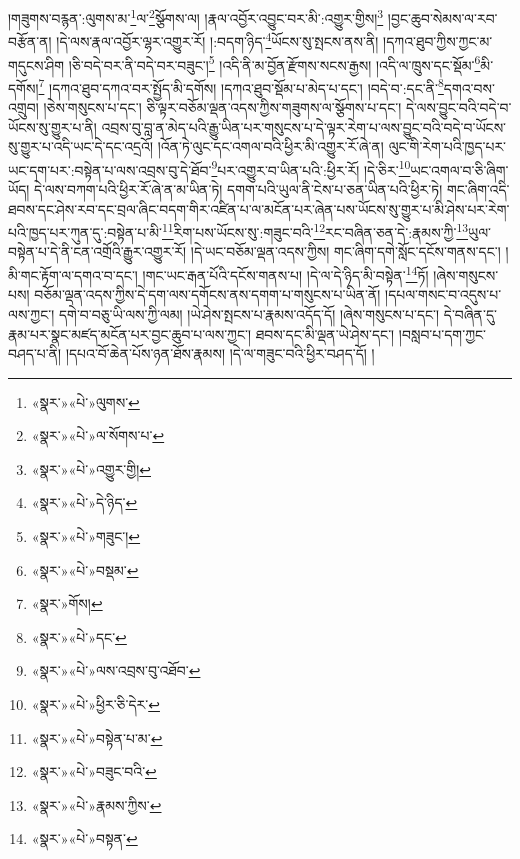 །གཟུགས་བརྙན་:ལུགས་མ་\footnote{«སྣར་»«པེ་»ལུགས་}ལ་\footnote{«སྣར་»«པེ་»ལ་སོགས་པ་}སྩོགས་ལ། །རྣལ་འབྱོར་འབྱུང་བར་མི་:འགྱུར་གྱིས།\footnote{«སྣར་»«པེ་»འགྱུར་གྱི།} །བྱང་ཆུབ་སེམས་ལ་རབ་བརྩོན་ན། །དེ་ལས་རྣལ་འབྱོར་ལྷར་འགྱུར་རོ། །:བདག་ཉིད་\footnote{«སྣར་»«པེ་»དེ་ཉིད་}ཡོངས་སུ་སྤངས་ནས་ནི། །དཀའ་ཐུབ་ཀྱིས་ཀྱང་མ་གདུངས་ཤིག །ཅི་བདེ་བར་ནི་བདེ་བར་བཟུང་།\footnote{«སྣར་»«པེ་»གཟུང་།} །འདི་ནི་མ་བྱོན་རྫོགས་སངས་རྒྱས། །འདི་ལ་ཁྲུས་དང་སྡོམ་\footnote{«སྣར་»«པེ་»བསྡམ་}མི་དགོས།\footnote{«སྣར་»གོས།} །དཀའ་ཐུབ་དཀའ་བར་སྤྱོད་མི་དགོས། །དཀའ་ཐུབ་སྡོམ་པ་མེད་པ་དང་། །བདེ་བ་:དང་ནི་\footnote{«སྣར་»«པེ་»དང་}དགའ་བས་འགྲུབ། །ཅེས་གསུངས་པ་དང་། ཅི་ལྟར་བཅོམ་ལྡན་འདས་ཀྱིས་གཟུགས་ལ་སྩོགས་པ་དང་། དེ་ལས་བྱུང་བའི་བདེ་བ་ཡོངས་སུ་གྱུར་པ་ནི། འབྲས་བུ་བླ་ན་མེད་པའི་རྒྱུ་ཡིན་པར་གསུངས་པ་དེ་ལྟར་རེག་པ་ལས་བྱུང་བའི་བདེ་བ་ཡོངས་སུ་གྱུར་པ་འདི་ཡང་དེ་དང་འདྲའོ། །འོན་ཏེ་ལུང་དང་འགལ་བའི་ཕྱིར་མི་འགྱུར་རོ་ཞེ་ན། ལུང་གི་རེག་པའི་ཁྱད་པར་ཡང་དག་པར་:བསྟེན་པ་ལས་འབྲས་བུ་དེ་ཐོབ་\footnote{«སྣར་»«པེ་»ལས་འབྲས་བུ་འཐོབ་}པར་འགྱུར་བ་ཡིན་པའི་:ཕྱིར་རོ། །དེ་ཅིར་\footnote{«སྣར་»«པེ་»ཕྱིར་ཅི་དེར་}ཡང་འགལ་བ་ཅི་ཞིག་ཡོད། དེ་ལས་བཀག་པའི་ཕྱིར་རོ་ཞེ་ན་མ་ཡིན་ཏེ། དགག་པའི་ཡུལ་ནི་ངེས་པ་ཅན་ཡིན་པའི་ཕྱིར་ཏེ། གང་ཞིག་འདི་ཐབས་དང་ཤེས་རབ་དང་བྲལ་ཞིང་བདག་གིར་འཛིན་པ་ལ་མངོན་པར་ཞེན་པས་ཡོངས་སུ་གྱུར་པ་མི་ཤེས་པར་རེག་པའི་ཁྱད་པར་ཀུན་དུ་:བསྟེན་པ་མི་\footnote{«སྣར་»«པེ་»བསྟེན་པ་མ་}རིག་པས་ཡོངས་སུ་:གཟུང་བའི་\footnote{«སྣར་»«པེ་»བཟུང་བའི་}རང་བཞིན་ཅན་དེ་:རྣམས་ཀྱི་\footnote{«སྣར་»«པེ་»རྣམས་ཀྱིས་}ཡུལ་བསྟེན་པ་དེ་ནི་ངན་འགྲོའི་རྒྱུར་འགྱུར་རོ། །དེ་ཡང་བཅོམ་ལྡན་འདས་ཀྱིས། གང་ཞིག་དགེ་སློང་དངོས་གནས་དང་། །མི་གང་རྟོག་ལ་དགའ་བ་དང་། །གང་ཡང་རྒན་པོའི་དངོས་གནས་པ། །དེ་ལ་དེ་ཉིད་མི་བསྟེན་\footnote{«སྣར་»«པེ་»བསྟན་}ཏོ། །ཞེས་གསུངས་པས། བཅོམ་ལྡན་འདས་ཀྱིས་དེ་དག་ལས་དགོངས་ནས་དགག་པ་གསུངས་པ་ཡིན་ནོ། །དཔལ་གསང་བ་འདུས་པ་ལས་ཀྱང་། དགེ་བ་བཅུ་ཡི་ལས་ཀྱི་ལམ། །ཡེ་ཤེས་སྤངས་པ་རྣམས་འདོད་དོ། །ཞེས་གསུངས་པ་དང་། དེ་བཞིན་དུ་རྣམ་པར་སྣང་མཛད་མངོན་པར་བྱང་ཆུབ་པ་ལས་ཀྱང་། ཐབས་དང་མི་ལྡན་ཡེ་ཤེས་དང་། །བསླབ་པ་དག་ཀྱང་བཤད་པ་ནི། །དཔའ་བོ་ཆེན་པོས་ཉན་ཐོས་རྣམས། །དེ་ལ་གཟུང་བའི་ཕྱིར་བཤད་དོ། །
